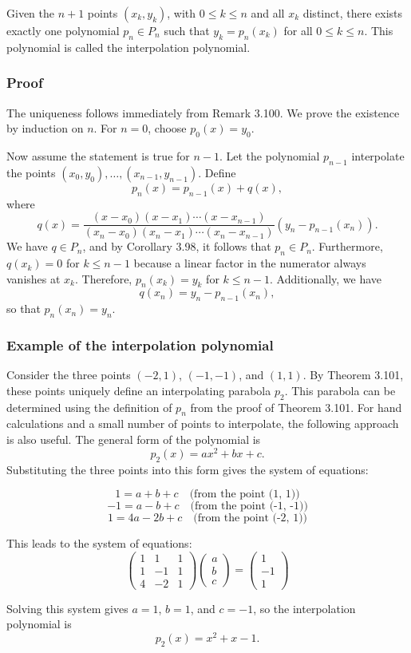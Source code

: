 Given the \(n+1\) points \((x_k, y_k)\), with \(0 \leq k \leq n\) and all \(x_k\) distinct, there exists exactly one polynomial \(p_n \in P_n\) such that \(y_k = p_n(x_k)\) for all \(0 \leq k \leq n\). This polynomial is called the interpolation polynomial.

\subsubsection*{Proof}

The uniqueness follows immediately from Remark 3.100. We prove the existence by induction on \(n\). For \(n = 0\), choose \(p_0(x) = y_0\). 

Now assume the statement is true for \(n-1\). Let the polynomial \(p_{n-1}\) interpolate the points \((x_0, y_0), \ldots, (x_{n-1}, y_{n-1})\). Define
\[
p_n(x) = p_{n-1}(x) + q(x),
\]
where
\[
q(x) = \frac{(x - x_0)(x - x_1)\cdots(x - x_{n-1})}{(x_n - x_0)(x_n - x_1)\cdots(x_n - x_{n-1})} (y_n - p_{n-1}(x_n)).
\]
We have \(q \in P_n\), and by Corollary 3.98, it follows that \(p_n \in P_n\). Furthermore, \(q(x_k) = 0\) for \(k \leq n-1\) because a linear factor in the numerator always vanishes at \(x_k\). Therefore, \(p_n(x_k) = y_k\) for \(k \leq n-1\). Additionally, we have
\[
q(x_n) = y_n - p_{n-1}(x_n),
\]
so that \(p_n(x_n) = y_n\). 

\QED

\subsubsection{Example of the interpolation polynomial}

Consider the three points \((-2, 1)\), \((-1, -1)\), and \((1, 1)\). By Theorem 3.101, these points uniquely define an interpolating parabola \(p_2\). This parabola can be determined using the definition of \(p_n\) from the proof of Theorem 3.101. For hand calculations and a small number of points to interpolate, the following approach is also useful. The general form of the polynomial is 
\[
p_2(x) = ax^2 + bx + c.
\]
Substituting the three points into this form gives the system of equations:

\[
1 = a + b + c \quad \text{(from the point (1, 1))}
\]
\[
-1 = a - b + c \quad \text{(from the point (-1, -1))}
\]
\[
1 = 4a - 2b + c \quad \text{(from the point (-2, 1))}
\]

This leads to the system of equations:
\[
\begin{pmatrix}
1 & 1 & 1 \\
1 & -1 & 1 \\
4 & -2 & 1
\end{pmatrix}
\begin{pmatrix}
a \\
b \\
c
\end{pmatrix}
=
\begin{pmatrix}
1 \\
-1 \\
1
\end{pmatrix}
\]

Solving this system gives \(a = 1\), \(b = 1\), and \(c = -1\), so the interpolation polynomial is
\[
p_2(x) = x^2 + x - 1.
\]

\newpage

